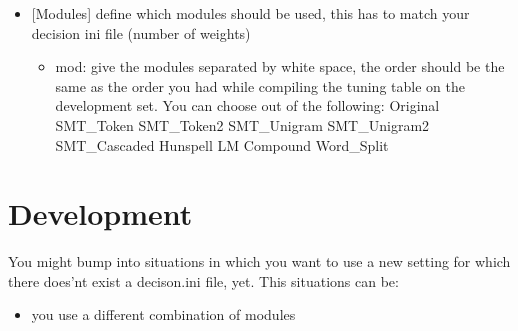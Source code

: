 \documentclass[letterpaper,10pt,english]{sphinxmanual}
\begin{document}
\begin{itemize}
\begin{itemize}
\end{itemize}

\item {} 
{[}Modules{]} define which modules should be used, this has to match your decision ini file (number of weights)
\begin{itemize}
\item {} 
mod: give the modules separated by white space, the order should be the same as the order you had while compiling the tuning table on the development set. You can choose out of the following:  Original SMT\_Token SMT\_Token2 SMT\_Unigram SMT\_Unigram2 SMT\_Cascaded Hunspell LM Compound Word\_Split

\end{itemize}

\end{itemize}


\chapter{Development}
\label{\detokenize{README:development}}
You might bump into situations in which you want to use a new setting for which there does’nt exist a decison.ini file, yet. This situations can be:
\begin{itemize}
\item {} 
you use a different combination of modules

\end{itemize}
\end{document}
